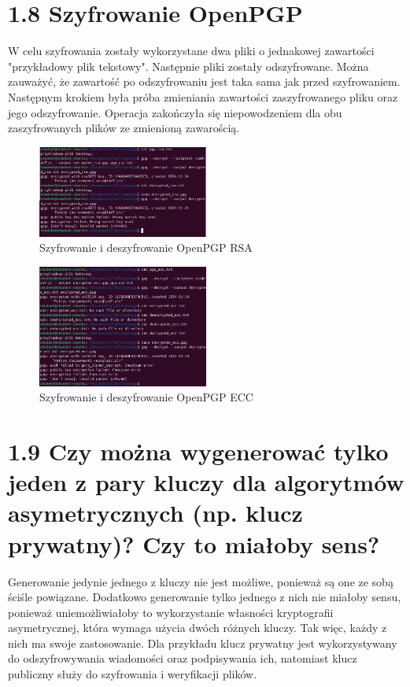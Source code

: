 \documentclass{article}
\begin{document}
\section*{1.8 Szyfrowanie OpenPGP}

W celu szyfrowania zostały wykorzystane dwa pliki o jednakowej zawartości "przykładowy plik tekstowy".
Następnie pliki zostały odszyfrowane. Można zauważyć, że zawartość po odszyfrowaniu jest taka sama jak przed szyfrowaniem.
Następnym krokiem była próba zmieniania zawartości zaszyfrowanego pliku oraz jego odszyfrowanie.
Operacja zakończyła się niepowodzeniem dla obu zaszyfrowanych plików ze zmienioną zawarością.

\begin{figure}[H]
    \centering
    \includegraphics[width=0.5\textwidth]{decrypt_rsa.png}
    \caption{Szyfrowanie i deszyfrowanie OpenPGP RSA}
\end{figure}



\begin{figure}[H]
    \centering
    \includegraphics[width=0.5\textwidth]{decrypt_ecc.png}
    \caption{Szyfrowanie i deszyfrowanie OpenPGP ECC}
\end{figure}



\section*{1.9 Czy można wygenerować tylko jeden z pary kluczy dla algorytmów
  asymetrycznych (np. klucz prywatny)? Czy to miałoby sens?}

Generowanie jedynie jednego z kluczy nie jest możliwe, ponieważ są one ze sobą ściśle powiązane. Dodatkowo generowanie tylko jednego z nich nie miałoby sensu,
ponieważ uniemożliwiałoby to wykorzystanie własności kryptografii asymetrycznej, która wymaga użycia dwóch różnych kluczy.
Tak więc, każdy z nich ma swoje zastosowanie. Dla przykładu klucz prywatny jest wykorzystywany do odszyfrowywania wiadomości oraz podpisywania ich, natomiast klucz publiczny służy do szyfrowania i weryfikacji plików.
\end{document}
